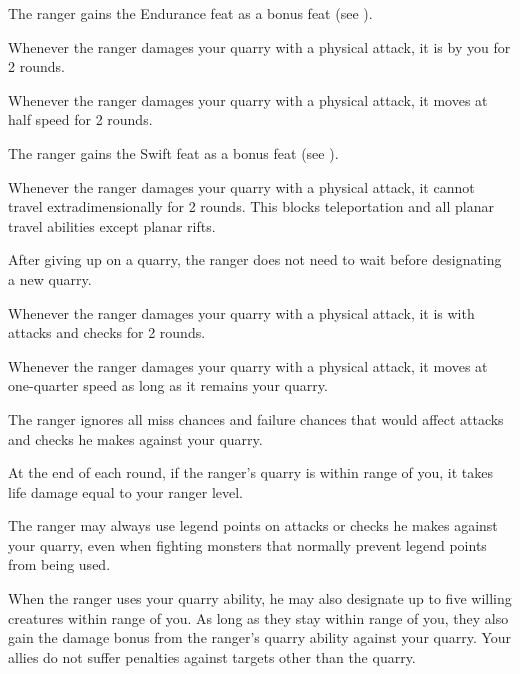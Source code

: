         The ranger gains the Endurance feat as a bonus feat (see ).

        Whenever the ranger damages your quarry with a physical attack, it is \goaded by you for 2 rounds.

        Whenever the ranger damages your quarry with a physical attack, it moves at half speed for 2 rounds.

        The ranger gains the Swift feat as a bonus feat (see ).

        Whenever the ranger damages your quarry with a physical attack, it cannot travel extradimensionally for 2 rounds.
        This blocks teleportation and all planar travel abilities except planar rifts.

        After giving up on a quarry, the ranger does not need to wait before designating a new quarry.

        Whenever the ranger damages your quarry with a physical attack, it is \impaired with attacks and checks for 2 rounds.

        Whenever the ranger damages your quarry with a physical attack, it moves at one-quarter speed as long as it remains your quarry.

        The ranger ignores all miss chances and failure chances that would affect attacks and checks he makes against your quarry.

        At the end of each round, if the ranger's quarry is within \rnglong range of you, it takes life damage equal to your ranger level.

        The ranger may always use legend points on attacks or checks he makes against your quarry, even when fighting monsters that normally prevent legend points from being used.

        When the ranger uses your quarry ability, he may also designate up to five willing creatures within \rnglong range of you.
        As long as they stay within \rnglong range of you, they also gain the damage bonus from the ranger's quarry ability against your quarry.
        Your allies do not suffer penalties against targets other than the quarry.

